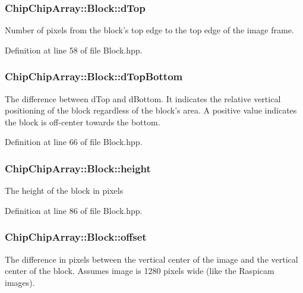 \hypertarget{classChipChipArray_1_1Block_a4e792a05f677eafbeb9439a9e631c255}{
\subsubsection[{d\+Top}]{ Chip\+Chip\+Array\+::\+Block\+::d\+Top}}\label{classChipChipArray_1_1Block_a4e792a05f677eafbeb9439a9e631c255}
Number of pixels from the block's top edge to the top edge of the image frame. 

Definition at line 58 of file Block.\+hpp.

\hypertarget{classChipChipArray_1_1Block_a5b6e72665d0de840a123717e24ca5cf9}{
\subsubsection[{d\+Top\+Bottom}]{ Chip\+Chip\+Array\+::\+Block\+::d\+Top\+Bottom}}\label{classChipChipArray_1_1Block_a5b6e72665d0de840a123717e24ca5cf9}
The difference between d\+Top and d\+Bottom. It indicates the relative vertical positioning of the block regardless of the block's area. A positive value indicates the block is off-\/center towards the bottom. 

Definition at line 66 of file Block.\+hpp.

\hypertarget{classChipChipArray_1_1Block_aed94802c166c9b4553764eb637717a2a}{
\subsubsection[{height}]{ Chip\+Chip\+Array\+::\+Block\+::height}}\label{classChipChipArray_1_1Block_aed94802c166c9b4553764eb637717a2a}
The height of the block in pixels 

Definition at line 86 of file Block.\+hpp.

\hypertarget{classChipChipArray_1_1Block_a42e2ca0775dc09b04049a2db1bc0bb4f}{
\subsubsection[{offset}]{ Chip\+Chip\+Array\+::\+Block\+::offset}}\label{classChipChipArray_1_1Block_a42e2ca0775dc09b04049a2db1bc0bb4f}
The difference in pixels between the vertical center of the image and the vertical center of the block. Assumes image is 1280 pixels wide (like the Raspicam images). 


